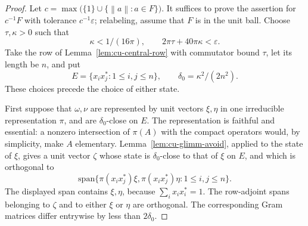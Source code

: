 \begin{proof}
Let $c=\max\bigl(\{1\}\cup\{\left\|a\right\|:a\in F\}\bigr)$. It suffices to
prove the assertion for $c^{-1}F$ with tolerance $c^{-1}\varepsilon$;
relabeling, assume that $F$ is in the unit ball. Choose $\tau,\kappa>0$ such
that 
\begin{equation*}
\kappa<1/(16\pi),\qquad 2\pi\tau+40\pi\kappa<\varepsilon.
\end{equation*}
Take the row of Lemma~\ref{lem:cu-central-row} with commutator bound $\tau$,
let its length be $n$, and put 
\begin{equation*}
E=\{x_ix_j^*:1\leq i,j\leq n\},\qquad \delta_0=\kappa^2/(2n^2).
\end{equation*}
These choices precede the choice of either state.

First suppose that $\omega,\nu$ are represented by unit vectors $\xi,\eta$
in one irreducible representation $\pi$, and are $\delta_0$-close on $E$.
The representation is faithful and essential: a nonzero intersection of $\pi(A)$ with the compact operators would, by simplicity, make $A$
elementary. Lemma~\ref{lem:cu-glimm-avoid}, applied to the state of $\xi$,
gives a unit vector $\zeta$ whose state is $\delta_0$-close to that of $\xi$
on $E$, and which is orthogonal to 
\begin{equation*}
\mathrm{span}\{\pi(x_ix_j^*)\xi,\pi(x_ix_j^*)\eta:1\leq i,j\leq n\}.
\end{equation*}
The displayed span contains $\xi,\eta$, because $\sum_i x_ix_i^*=1$. The
row-adjoint spans belonging to $\zeta$ and to either $\xi$ or $\eta$ are
orthogonal. The corresponding Gram matrices differ entrywise by less than $2\delta_0$.


\end{proof}
